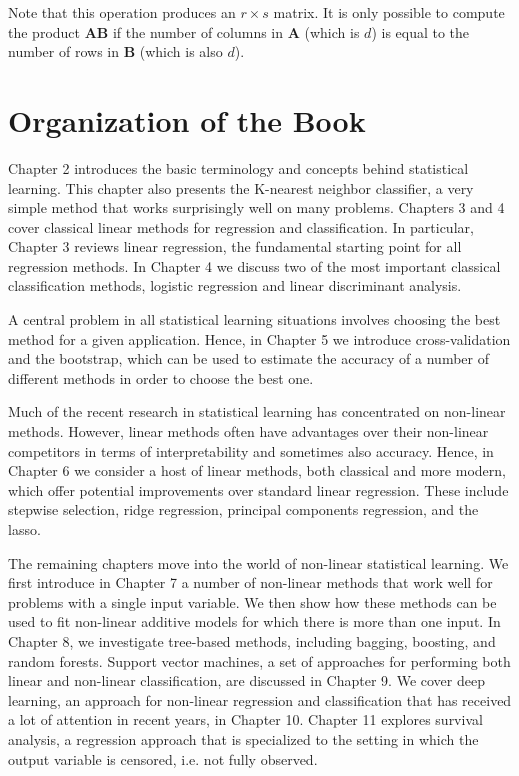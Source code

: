 Note that this operation produces an \( r \times s \) matrix. It is only possible to compute the product \( \mathbf{A}\mathbf{B} \) if the number of columns in \( \mathbf{A} \) (which is \( d \)) is equal to the number of rows in \( \mathbf{B} \) (which is also \( d \)).

\section{Organization of the Book}
\label{sec:organization}

Chapter 2 introduces the basic terminology and concepts behind statistical learning. This chapter also presents the K-nearest neighbor classifier, a very simple method that works surprisingly well on many problems. Chapters 3 and 4 cover classical linear methods for regression and classification. In particular, Chapter 3 reviews linear regression, the fundamental starting point for all regression methods. In Chapter 4 we discuss two of the most important classical classification methods, logistic regression and linear discriminant analysis.

A central problem in all statistical learning situations involves choosing the best method for a given application. Hence, in Chapter 5 we introduce cross-validation and the bootstrap, which can be used to estimate the accuracy of a number of different methods in order to choose the best one.

Much of the recent research in statistical learning has concentrated on non-linear methods. However, linear methods often have advantages over their non-linear competitors in terms of interpretability and sometimes also accuracy. Hence, in Chapter 6 we consider a host of linear methods, both classical and more modern, which offer potential improvements over standard linear regression. These include stepwise selection, ridge regression, principal components regression, and the lasso.

The remaining chapters move into the world of non-linear statistical learning. We first introduce in Chapter 7 a number of non-linear methods that work well for problems with a single input variable. We then show how these methods can be used to fit non-linear additive models for which there is more than one input. In Chapter 8, we investigate tree-based methods, including bagging, boosting, and random forests. Support vector machines, a set of approaches for performing both linear and non-linear classification, are discussed in Chapter 9. We cover deep learning, an approach for non-linear regression and classification that has received a lot of attention in recent years, in Chapter 10. Chapter 11 explores survival analysis, a regression approach that is specialized to the setting in which the output variable is censored, i.e. not fully observed.

